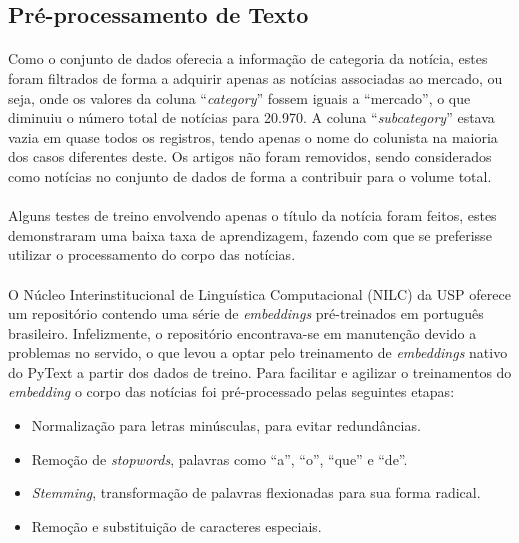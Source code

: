 \documentclass[grad,numbers]{coppe}
\begin{document}
  		\subsection{Pré-processamento de Texto}
  			\paragraph{}Como o conjunto de dados oferecia a informação de categoria da notícia, estes foram filtrados de forma a adquirir apenas as notícias associadas ao mercado, ou seja, onde os valores da coluna ``\textit{category}'' fossem iguais a ``mercado'', o que diminuiu o número total de notícias para 20.970. A coluna ``\textit{subcategory}'' estava vazia em quase todos os registros, tendo apenas o nome do colunista na maioria dos casos diferentes deste. Os artigos não foram removidos, sendo considerados como notícias no conjunto de dados de forma a contribuir para o volume total.
  			\paragraph{}Alguns testes de treino envolvendo apenas o título da notícia foram feitos, estes demonstraram uma baixa taxa de aprendizagem, fazendo com que se preferisse utilizar o processamento do corpo das notícias.
  			\paragraph{}O Núcleo Interinstitucional de Linguística Computacional (NILC) da USP oferece um repositório\cite{nilc-repo} contendo uma série de \textit{embeddings} pré-treinados em português brasileiro. Infelizmente, o repositório encontrava-se em manutenção devido a problemas no servido, o que levou a optar pelo treinamento de \textit{embeddings} nativo do PyText a partir dos dados de treino. Para facilitar e agilizar o treinamentos do \textit{embedding} o corpo das notícias foi pré-processado pelas seguintes etapas:
  			\begin{itemize}
  				\item Normalização para letras minúsculas, para evitar redundâncias.
  				\item Remoção de \textit{stopwords}, palavras como ``a'', ``o'', ``que'' e ``de''.
  				\item \textit{Stemming}, transformação de palavras flexionadas para sua forma radical.
  				\item Remoção e substituição de caracteres especiais.
  			\end{itemize}
\end{document}
